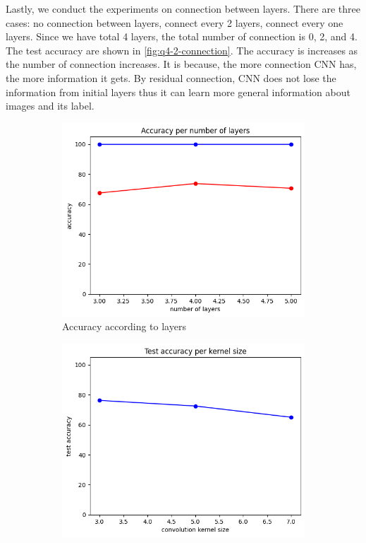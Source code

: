 Lastly, we conduct the experiments on connection between layers. There are three cases: no connection between layers, connect every 2 layers, connect every one layers. Since we have total 4 layers, the total number of connection is 0, 2, and 4. The test accuracy are shown in \cref{fig:q4-2-connection}. The accuracy is increases as the number of connection increases. It is because, the more connection CNN has, the more information it gets. By residual connection, CNN does not lose the information from initial layers thus it can learn more general information about images and its label.

\begin{figure}[htbp]
	\centering
	\begin{subfigure}[t]{0.3\linewidth}
		\centering
		\includegraphics[width=\linewidth]{image/q4-2-layers.png}
		\caption{Accuracy according to layers}
		\label{fig:q4-2-layers}
	\end{subfigure}	
    \hfill
	\begin{subfigure}[t]{0.3\linewidth}
		\centering
		\includegraphics[width=\linewidth]{image/q4-2-kernel.png}

\end{subfigure}
\end{figure}
